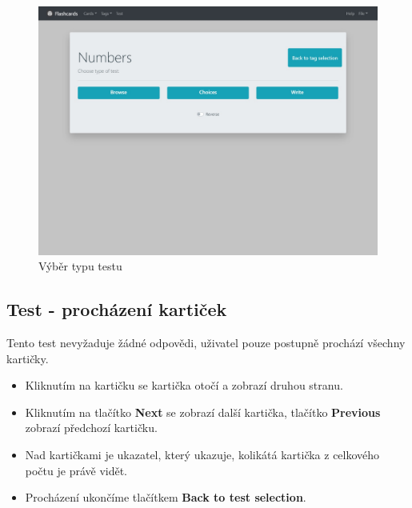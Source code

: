 \documentclass[11pt]{article}
\providecommand{\tightlist}{\setlength{\itemsep}{1pt}\setlength{\parskip}{1pt}}
\begin{document}
\begin{figure}
\centering
\includegraphics{../../../../assets/test_type.jpg}
\caption{Výběr typu testu}
\end{figure}

\hypertarget{test---prochuxe1zenuxed-kartiux10dek}{%
\subsection{Test - procházení
kartiček}\label{test---prochuxe1zenuxed-kartiux10dek}}

Tento test nevyžaduje žádné odpovědi, uživatel pouze postupně prochází
všechny kartičky.

\begin{itemize}
\tightlist
\item
  Kliknutím na kartičku se kartička otočí a zobrazí druhou stranu.
\item
  Kliknutím na tlačítko \textbf{Next} se zobrazí další kartička,
  tlačítko \textbf{Previous} zobrazí předchozí kartičku.
\item
  Nad kartičkami je ukazatel, který ukazuje, kolikátá kartička z
  celkového počtu je právě vidět.
\item
  Procházení ukončíme tlačítkem \textbf{Back to test selection}.
\end{itemize}
\end{document}
